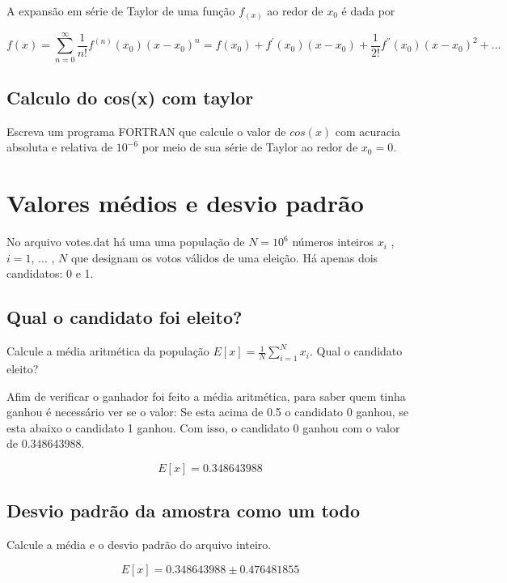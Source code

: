 \documentclass[a4paper, 12pt]{article}
\begin{document}
A expansão em série de Taylor de uma função $f_(x)$ ao redor de $x_0$ é dada por

\begin{equation*}
	f(x) = \sum_{n = 0}^{\infty} \frac{1}{n!} f^{(n)} (x_0) (x - x_0)^{n} = f(x_0) + f^{'}(x_0)(x-x_0) + \frac{1}{2!}f^{''}(x_0)(x-x_0)^2 + ...
\end{equation*}

\subsection{Calculo do cos(x) com taylor}
Escreva um programa FORTRAN que calcule o valor de $cos(x)$ 
com acuracia absoluta e relativa de 
$10^{-6}$ por meio de 
sua série de Taylor ao redor de $x_0 = 0$.

\section{Valores médios e desvio padrão}

No arquivo votes.dat há uma uma população de $N = 10^6$ números inteiros $x_i$ , $i = 1$, $...$ , $N$ que designam os votos
válidos de uma eleição. Há apenas dois candidatos: 0 e 1.

\subsection{Qual o candidato foi eleito?}

Calcule a média aritmética da população $E[x] = \frac{1}{N} \sum_{i = 1}^{N} x_i$. Qual o candidato eleito?

Afim de verificar o ganhador foi feito a média aritmética, para saber quem tinha ganhou é necessário ver se o valor: Se esta acima de 0.5 o candidato 0 ganhou, se esta abaixo o candidato 1 ganhou. Com isso, o candidato 0 ganhou com o valor de 0.348643988.

\begin{equation*}
	E[x] = 0.348643988
\end{equation*}

\subsection{Desvio padrão da amostra como um todo}

Calcule a média e o desvio padrão do arquivo inteiro.

\begin{equation*}
	E[x] = 0.348643988 \pm 0.476481855 
\end{equation*}
\end{document}
